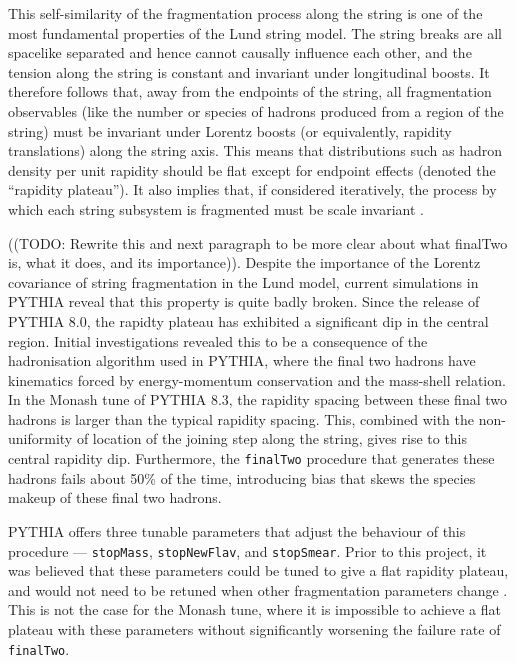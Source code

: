 \documentclass[12pt,a4paper]{report}
\begin{document}
This self-similarity of the fragmentation process along the string is one of the most fundamental properties of the Lund string model. The string breaks are all spacelike separated and hence cannot causally influence each other, and the tension along the string is constant and invariant under longitudinal boosts. It therefore follows that, away from the endpoints of the string, all fragmentation observables (like the number or species of hadrons produced from a region of the string) must be invariant under Lorentz boosts (or equivalently, rapidity translations) along the string axis. This means that distributions such as hadron density per unit rapidity should be flat except for endpoint effects (denoted the ``rapidity plateau''). It also implies that, if considered iteratively, the process by which each string subsystem is fragmented must be scale invariant \cite{Andersson:1983ia,Andersson:1997xwk,Bierlich:2022pfr}.

((TODO: Rewrite this and next paragraph to be more clear about what finalTwo is, what it does, and its importance)). Despite the importance of the Lorentz covariance of string fragmentation in the Lund model, current simulations in PYTHIA reveal that this property is quite badly broken. Since the release of PYTHIA 8.0, the rapidty plateau has exhibited a significant dip in the central region. Initial investigations revealed this to be a consequence of the hadronisation algorithm used in PYTHIA, where the final two hadrons have kinematics forced by energy-momentum conservation and the mass-shell relation. In the Monash tune of PYTHIA 8.3, the rapidity spacing between these final two hadrons is larger than the typical rapidity spacing. This, combined with the non-uniformity of location of the joining step along the string, gives rise to this central rapidity dip. Furthermore, the \texttt{finalTwo} procedure that generates these hadrons fails about 50\% of the time, introducing bias that skews the species makeup of these final two hadrons.

PYTHIA offers three tunable parameters that adjust the behaviour of this procedure --- \texttt{stopMass}, \texttt{stopNewFlav}, and \texttt{stopSmear}. Prior to this project, it was believed that these parameters could be tuned to give a flat rapidity plateau, and would not need to be retuned when other fragmentation parameters change \cite{Bierlich:2022pfr,Sjostrand:2006za}. This is not the case for the Monash tune, where it is impossible to achieve a flat plateau with these parameters without significantly worsening the failure rate of \texttt{finalTwo}.
\end{document}
